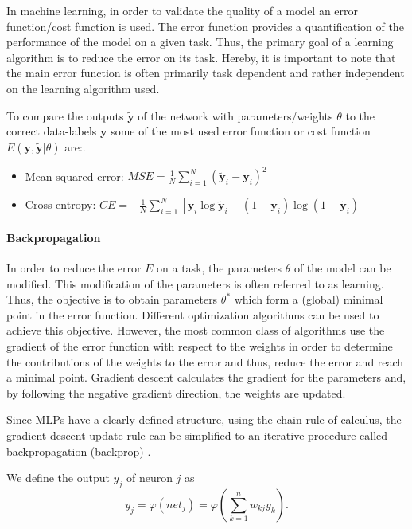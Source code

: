 In machine learning, in order to validate the quality of a model an error function/cost function is used.
The error function provides a quantification of the performance of the model on a given task.
Thus, the primary goal of a learning algorithm is to reduce the error on its task.
Hereby, it is important to note that the main error function is often primarily task dependent and rather independent on the learning algorithm used.  

To compare the outputs $\tilde{\textbf{y}}$ of the network with parameters/weights $\theta$ to the correct data-labels $\textbf{y}$ some of the most used error function or cost function $E(\textbf{y},\tilde{\textbf{y}} | \theta)$ are:.

\begin{itemize}
	\item Mean squared error: $MSE = \frac{1}{N} \sum_{i=1}^N (\tilde{\textbf{y}}_i - \textbf{y}_i)^2 $
	\item Cross entropy: $CE = - \frac{1}{N} \sum_{i=1}^N [ \textbf{y}_i \log \tilde{\textbf{y}}_i + (1 - \textbf{y}_i) \log (1 - \tilde{\textbf{y}}_i)]$
\end{itemize}

\paragraph{Backpropagation} \label{c:backprop}

In order to reduce the error $E$ on a task, the parameters $\theta$ of the model can be modified.
This modification of the parameters is often referred to as learning.
Thus, the objective is to obtain parameters $\theta^*$ which form a (global) minimal point in the error function. 
Different optimization algorithms can be used to achieve this objective.
However, the most common class of algorithms use the gradient of the error function with respect to the weights in order to determine the contributions of the weights to the error and thus, reduce the error and reach a minimal point.
Gradient descent calculates the gradient for the parameters and, by following the negative gradient direction, the weights are updated.

Since MLPs have a clearly defined structure, using the chain rule of calculus, the gradient descent update rule can be simplified to an iterative procedure called backpropagation (backprop)  \cite{rumelhart1985learning}\cite{Goodfellow-et-al-2016-Book}.

We define the output $y_j$ of neuron $j$ as
\[
	y_j = \varphi(net_j) = \varphi(\sum_{k=1}^n w_{kj} y_k) .
\]
 
